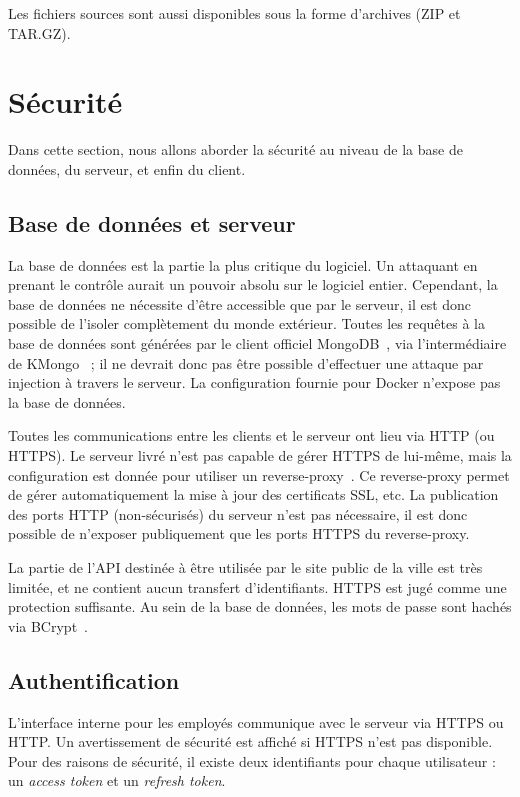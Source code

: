 \documentclass[11pt,french]{memoir}
\begin{document}
	Les fichiers sources sont aussi disponibles sous la forme d'archives (ZIP et TAR.GZ).


	\section{Sécurité}\label{sec:securite}

	Dans cette section, nous allons aborder la sécurité au niveau de la base de données, du serveur,
	et enfin du client.

	\subsection{Base de données et serveur}\label{subsec:base-de-donnees-et-serveur}

	La base de données est la partie la plus critique du logiciel.
	Un attaquant en prenant le contrôle aurait un pouvoir absolu sur le logiciel entier.
	Cependant, la base de données ne nécessite d’être accessible que par le serveur, il est donc possible de l’isoler complètement du monde extérieur.
	Toutes les requêtes à la base de données sont générées par le client officiel MongoDB~\cite{mongo}, via l’intermédiaire de KMongo~\cite{mongo-kotlin} ; il ne devrait donc pas être possible d’effectuer une attaque par injection à travers le serveur.
	La configuration fournie pour Docker n’expose pas la base de données.

	\uparagraph
	Toutes les communications entre les clients et le serveur ont lieu via HTTP (ou HTTPS).
	Le serveur livré n’est pas capable de gérer HTTPS de lui-même, mais la configuration est donnée pour utiliser un reverse-proxy~\cite{caddy}.
	Ce reverse-proxy permet de gérer automatiquement la mise à jour des certificats SSL, etc.
	La publication des ports HTTP (non-sécurisés) du serveur n’est pas nécessaire, il est donc possible de n’exposer publiquement que les ports HTTPS du reverse-proxy.

	La partie de l’API destinée à être utilisée par le site public de la ville est très limitée, et ne contient aucun transfert d’identifiants.
	HTTPS est jugé comme une protection suffisante.
	Au sein de la base de données, les mots de passe sont hachés via BCrypt~\cite{bcrypt}.

	\subsection{Authentification}\label{subsec:authentification}

	L’interface interne pour les employés communique avec le serveur via HTTPS ou HTTP.
	Un avertissement de sécurité est affiché si HTTPS n’est pas disponible.
	Pour des raisons de sécurité, il existe deux identifiants pour chaque utilisateur : un \emph{access token} et un \emph{refresh token}.
\end{document}
